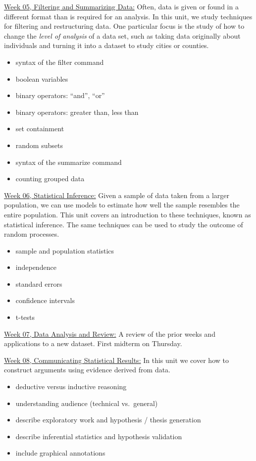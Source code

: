 \documentclass[12pt]{article}
\begin{document}
\bigskip

\underline{Week 05, Filtering and Summarizing Data:}
Often, data is given or found in a different format than is required for
an analysis. In this unit, we study techniques for filtering and
restructuring data. One particular focus is the study of how to
change the \textit{level of analysis} of a data set, such as taking
data originally about individuals and turning it into a dataset to
study cities or counties.
\begin{itemize}\setlength\itemsep{0em}
\item
  syntax of the filter command
\item
  boolean variables
\item
  binary operators: ``and'', ``or''
\item
  binary operators: greater than, less than
\item
  set containment
\item
  random subsets
\item
  syntax of the summarize command
\item
  counting grouped data
\end{itemize}

\bigskip

\underline{Week 06, Statistical Inference:}
Given a sample of data taken from a larger population, we can use
models to estimate how well the sample resembles the entire population.
This unit covers an introduction to these techniques, known as statistical
inference. The same techniques can be used to study the outcome of random
processes.
\begin{itemize}\setlength\itemsep{0em}
\item
  sample and population statistics
\item
  independence
\item
  standard errors
\item
  confidence intervals
\item
  t-tests
\end{itemize}

\bigskip

\underline{Week 07, Data Analysis and Review:}
A review of the prior weeks and applications to a
new dataset. First midterm on Thursday.

\bigskip

\underline{Week 08, Communicating Statistical Results:}
In this unit we cover how to construct arguments using evidence derived
from data.
\begin{itemize}\setlength\itemsep{0em}
\item
  deductive versus inductive reasoning
\item
  understanding audience (technical vs.~general)
\item
  describe exploratory work and hypothesis / thesis generation
\item
  describe inferential statistics and hypothesis validation
\item
  include graphical annotations
\end{itemize}
\end{document}
